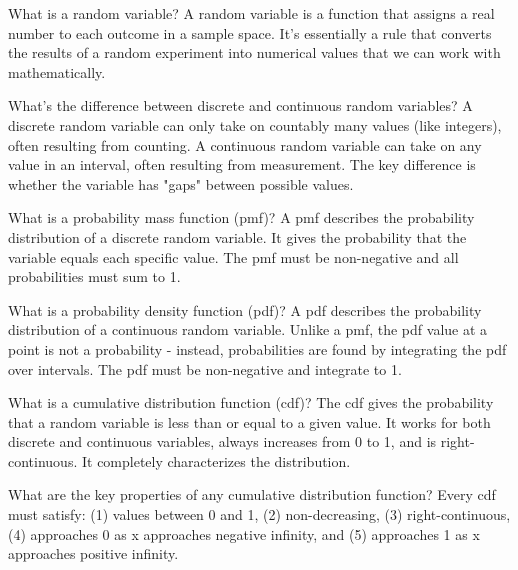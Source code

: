 \documentclass[avery5371,grid]{flashcards}
\begin{document}
\begin{flashcard}{What is a random variable?}
A random variable is a function that assigns a real number to each outcome in a sample space. It's essentially a rule that converts the results of a random experiment into numerical values that we can work with mathematically.
\end{flashcard}

\begin{flashcard}{What's the difference between discrete and continuous random variables?}
A discrete random variable can only take on countably many values (like integers), often resulting from counting. A continuous random variable can take on any value in an interval, often resulting from measurement. The key difference is whether the variable has "gaps" between possible values.
\end{flashcard}

\begin{flashcard}{What is a probability mass function (pmf)?}
A pmf describes the probability distribution of a discrete random variable. It gives the probability that the variable equals each specific value. The pmf must be non-negative and all probabilities must sum to 1.
\end{flashcard}

\begin{flashcard}{What is a probability density function (pdf)?}
A pdf describes the probability distribution of a continuous random variable. Unlike a pmf, the pdf value at a point is not a probability - instead, probabilities are found by integrating the pdf over intervals. The pdf must be non-negative and integrate to 1.
\end{flashcard}

\begin{flashcard}{What is a cumulative distribution function (cdf)?}
The cdf gives the probability that a random variable is less than or equal to a given value. It works for both discrete and continuous variables, always increases from 0 to 1, and is right-continuous. It completely characterizes the distribution.
\end{flashcard}

\begin{flashcard}{What are the key properties of any cumulative distribution function?}
Every cdf must satisfy: (1) values between 0 and 1, (2) non-decreasing, (3) right-continuous, (4) approaches 0 as x approaches negative infinity, and (5) approaches 1 as x approaches positive infinity.
\end{flashcard}
\end{document}
